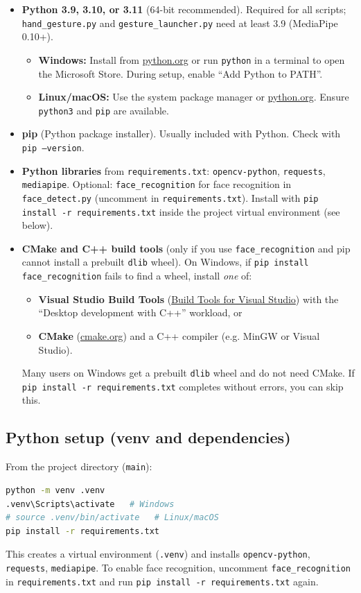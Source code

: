 \documentclass[a4paper,12pt]{article}
\begin{document}
\begin{itemize}
    \item \textbf{Python 3.9, 3.10, or 3.11} (64-bit recommended). Required for all scripts; \texttt{hand\_gesture.py} and \texttt{gesture\_launcher.py} need at least 3.9 (MediaPipe 0.10+).
    \begin{itemize}
        \item \textbf{Windows:} Install from \href{https://www.python.org/downloads/}{python.org} or run \texttt{python} in a terminal to open the Microsoft Store. During setup, enable ``Add Python to PATH''.
        \item \textbf{Linux/macOS:} Use the system package manager or \href{https://www.python.org/downloads/}{python.org}. Ensure \texttt{python3} and \texttt{pip} are available.
    \end{itemize}
    \item \textbf{pip} (Python package installer). Usually included with Python. Check with \texttt{pip --version}.
    \item \textbf{Python libraries} from \texttt{requirements.txt}: \texttt{opencv-python}, \texttt{requests}, \texttt{mediapipe}. Optional: \texttt{face\_recognition} for face recognition in \texttt{face\_detect.py} (uncomment in \texttt{requirements.txt}). Install with \texttt{pip install -r requirements.txt} inside the project virtual environment (see below).
    \item \textbf{CMake and C++ build tools} (only if you use \texttt{face\_recognition} and pip cannot install a prebuilt \texttt{dlib} wheel). On Windows, if \texttt{pip install face\_recognition} fails to find a wheel, install \emph{one} of:
    \begin{itemize}
        \item \textbf{Visual Studio Build Tools} (\href{https://visualstudio.microsoft.com/visual-cpp-build-tools/}{Build Tools for Visual Studio}) with the ``Desktop development with C++'' workload, or
        \item \textbf{CMake} (\href{https://cmake.org/download/}{cmake.org}) and a C++ compiler (e.g. MinGW or Visual Studio).
    \end{itemize}
    Many users on Windows get a prebuilt \texttt{dlib} wheel and do not need CMake. If \texttt{pip install -r requirements.txt} completes without errors, you can skip this.
\end{itemize}

\subsection{Python setup (venv and dependencies)}
From the project directory (\texttt{main}):
\begin{lstlisting}[language=bash]
python -m venv .venv
.venv\Scripts\activate   # Windows
# source .venv/bin/activate   # Linux/macOS
pip install -r requirements.txt
\end{lstlisting}
This creates a virtual environment (\texttt{.venv}) and installs \texttt{opencv-python}, \texttt{requests}, \texttt{mediapipe}. To enable face recognition, uncomment \texttt{face\_recognition} in \texttt{requirements.txt} and run \texttt{pip install -r requirements.txt} again.
\end{document}
